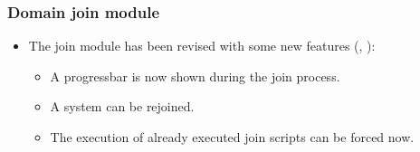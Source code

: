 \subsubsection{Domain join module}
\begin{itemize}
\item The join module has been revised with some new features (, ):
  \begin{itemize}
    \item A progressbar is now shown during the join process.
    \item A system can be rejoined.
    \item The execution of already executed join scripts can be forced now.
  \end{itemize}
\end{itemize}

